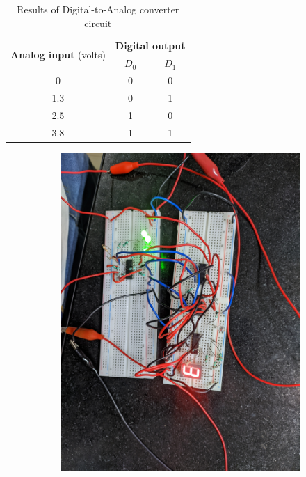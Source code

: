 \documentclass[%
 reprint,
nofootinbib,
 amsmath,amssymb,
 aps,
floatfix,
]{revtex4-2}
\begin{document}
    \begin{table}[]
    \caption{Results of Digital-to-Analog converter circuit}
    \label{tab:ADC}
    \setlength{\tabcolsep}{15pt}
    \begin{tabular}{@{}ccc@{}}
    \toprule
    \multirow{2}{*}{\textbf{Analog input} (volts)} & \multicolumn{2}{c}{\textbf{Digital output}} \\ \cmidrule(l){2-3} 
     & $D_0$ & $D_1$ \\ \midrule
    0 & 0 & 0 \\
    1.3 & 0 & 1 \\
    2.5 & 1 & 0 \\
    3.8 & 1 & 1 \\ \bottomrule
    \end{tabular}
    \end{table}
    \begin{figure}
        \centering
        \begin{subfigure}[b]{0.3\textwidth}
            \centering
            \includegraphics[width=\textwidth]{Figures/3.jpg}

\end{subfigure}
\end{figure}
\end{document}
